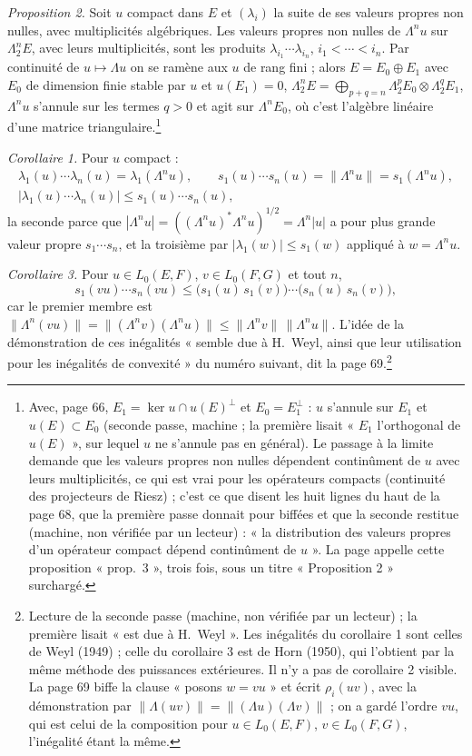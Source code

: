 \documentclass[11pt,a4paper]{article}
\begin{document}
\emph{Proposition 2.} Soit $u$ compact dans $E$ et $(\lambda_i)$ la suite de
ses valeurs propres non nulles, avec multiplicités algébriques. Les valeurs
propres non nulles de $\Lambda^n u$ sur $\Lambda^n_2 E$, avec leurs
multiplicités, sont les produits $\lambda_{i_1} \cdots \lambda_{i_n}$,
$i_1 < \cdots < i_n$. Par continuité de $u \mapsto \Lambda u$ on se ramène
aux $u$ de rang fini ; alors $E = E_0 \oplus E_1$ avec $E_0$ de dimension
finie stable par $u$ et $u(E_1) = 0$, $\Lambda^n_2 E = \bigoplus_{p+q=n}
\Lambda^p_2 E_0 \otimes \Lambda^q_2 E_1$, $\Lambda^n u$ s'annule sur les
termes $q > 0$ et agit sur $\Lambda^n E_0$, où c'est l'algèbre linéaire
d'une matrice triangulaire.\footnote{Avec, page 66, $E_1 = \ker u \cap
u(E)^{\perp}$ et $E_0 = E_1^{\perp}$ : $u$ s'annule sur $E_1$ et $u(E)
\subset E_0$ (seconde passe, machine ; la première lisait « $E_1$
l'orthogonal de $u(E)$ », sur lequel $u$ ne s'annule pas en général). Le
passage à la limite demande que les valeurs propres non nulles dépendent
continûment de $u$ avec leurs multiplicités, ce qui est vrai pour les
opérateurs compacts (continuité des projecteurs de Riesz) ; c'est ce que
disent les huit lignes du haut de la page 68, que la première passe donnait
pour biffées et que la seconde restitue (machine, non vérifiée par un
lecteur) : « la distribution des valeurs propres d'un opérateur compact
dépend continûment de $u$ ». La page appelle cette proposition « prop.~3 »,
trois fois, sous un titre « Proposition 2 » surchargé.}

\emph{Corollaire 1.} Pour $u$ compact :
\begin{gather*}
  \lambda_1(u) \cdots \lambda_n(u) = \lambda_1(\Lambda^n u), \qquad
  s_1(u) \cdots s_n(u) = \|\Lambda^n u\| = s_1(\Lambda^n u), \\
  |\lambda_1(u) \cdots \lambda_n(u)| \leq s_1(u) \cdots s_n(u),
\end{gather*}
la seconde parce que $|\Lambda^n u| = ((\Lambda^n u)^{*}\Lambda^n u)^{1/2} =
\Lambda^n |u|$ a pour plus grande valeur propre $s_1 \cdots s_n$, et la
troisième par $|\lambda_1(w)| \leq s_1(w)$ appliqué à $w = \Lambda^n u$.

\emph{Corollaire 3.} Pour $u \in L_0(E,F)$, $v \in L_0(F,G)$ et tout $n$,
\[
  s_1(vu) \cdots s_n(vu) \leq \bigl(s_1(u)\,s_1(v)\bigr) \cdots \bigl(s_n(u)\,s_n(v)\bigr),
\]
car le premier membre est $\|\Lambda^n(vu)\| = \|(\Lambda^n v)(\Lambda^n u)\|
\leq \|\Lambda^n v\|\,\|\Lambda^n u\|$. L'idée de la démonstration de ces
inégalités « semble due à H.\ Weyl, ainsi que leur utilisation pour les
inégalités de convexité » du numéro suivant, dit la page 69.\footnote{Lecture
de la seconde passe (machine, non vérifiée par un lecteur) ; la première
lisait « est due à H.~Weyl ». Les inégalités du corollaire 1 sont celles de
Weyl (1949) ; celle du corollaire 3 est de Horn (1950), qui l'obtient par la
même méthode des puissances extérieures. Il n'y a pas de corollaire 2
visible. La page 69 biffe la clause « posons $w = vu$ » et écrit
$\rho_i(uv)$, avec la démonstration par $\|\Lambda(uv)\| = \|(\Lambda
u)(\Lambda v)\|$ ; on a gardé l'ordre $vu$, qui est celui de la composition
pour $u \in L_0(E,F)$, $v \in L_0(F,G)$, l'inégalité étant la même.}
\end{document}
